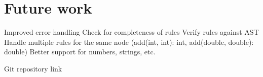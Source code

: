 \documentclass[nofilelist]{cslthse-msc}
\begin{document}
\section{Future work}
Improved error handling
Check for completeness of rules
Verify rules against AST
Handle multiple rules for the same node (add(int, int): int, add(double, double): double)
Better support for numbers, strings, etc.


{} %

\begin{appendices} %
Git repository link

\printfilelist

\checkoddpage
\ifoddpage
\else
   \newpage
   \thispagestyle{empty}
   \mbox{ }
\fi

\end{appendices}
\end{document}
